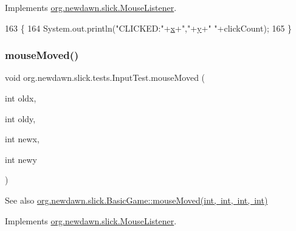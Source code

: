 Implements \mbox{\hyperlink{interfaceorg_1_1newdawn_1_1slick_1_1_mouse_listener_a3e42b74c252ecdc7418b0ee8bcae5510}{org.\+newdawn.\+slick.\+Mouse\+Listener}}.


\begin{DoxyCode}
163                                                                        \{
164         System.out.println(\textcolor{stringliteral}{"CLICKED:"}+\mbox{\hyperlink{classorg_1_1newdawn_1_1slick_1_1tests_1_1_input_test_a95f99c94f1e661a629501a3205d78c15}{x}}+\textcolor{stringliteral}{","}+\mbox{\hyperlink{classorg_1_1newdawn_1_1slick_1_1tests_1_1_input_test_a18ce34ad5ddc268a0420c747d5b19d05}{y}}+\textcolor{stringliteral}{" "}+clickCount);
165     \}
\end{DoxyCode}
\mbox{\label{classorg_1_1newdawn_1_1slick_1_1tests_1_1_input_test_a21d3311cf60fcac31409926d3c3323b7}} 
\subsubsection{\texorpdfstring{mouse\+Moved()}{mouseMoved()}}
{\footnotesize\ttfamily void org.\+newdawn.\+slick.\+tests.\+Input\+Test.\+mouse\+Moved (\begin{DoxyParamCaption}\item[{int}]{oldx,  }\item[{int}]{oldy,  }\item[{int}]{newx,  }\item[{int}]{newy }\end{DoxyParamCaption})\hspace{0.3cm}{\ttfamily [inline]}}

\begin{DoxySeeAlso}{See also}
\mbox{\hyperlink{classorg_1_1newdawn_1_1slick_1_1_basic_game_adaed74556aba405022579f9369f042eb}{org.\+newdawn.\+slick.\+Basic\+Game\+::mouse\+Moved(int, int, int, int)}} 
\end{DoxySeeAlso}


Implements \mbox{\hyperlink{interfaceorg_1_1newdawn_1_1slick_1_1_mouse_listener_ad41216afc84f2c8d38f91e8b2d46bed9}{org.\+newdawn.\+slick.\+Mouse\+Listener}}.


